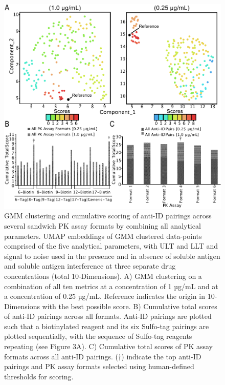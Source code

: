 \begin{figure}[H]
 \centering
 \includegraphics{graphics/ch3/Figure_7.pdf}
 \caption{GMM clustering and cumulative scoring of anti-ID pairings across several sandwich PK assay formats by combining all analytical parameters. UMAP embeddings of GMM clustered data-points comprised of the five analytical parameters, with ULT and LLT and signal to noise used in the presence and in absence of soluble antigen and soluble antigen interference at three separate drug concentrations (total 10-Dimensions). A) GMM clustering on a combination of all ten metrics at a concentration of 1 µg/mL and at a concentration of 0.25 µg/mL. Reference indicates the origin in 10-Dimensions with the best possible score. B) Cumulative total scores of anti-ID pairings across all formats.  Anti-ID pairings are plotted such that a biotinylated reagent and its six Sulfo-tag pairings are plotted sequentially, with the sequence of Sulfo-tag reagents repeating (see Figure 3A). C)  Cumulative total scores of PK assay formats across all anti-ID pairings.  (†) indicate the top anti-ID pairings and PK assay formats selected using human-defined thresholds for scoring.}
 \end{figure}

